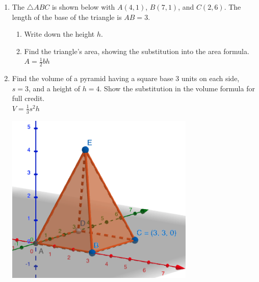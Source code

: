 \documentclass[12pt, twoside]{article}
\begin{document}
\begin{enumerate}
\newpage
\item The $\triangle ABC$ is shown below with $A(4,1)$, $B(7,1)$, and $C(2,6)$. The length of the base of the triangle is $AB=3$.
  \begin{multicols}{2}
    \begin{enumerate}
      \item Write down the height $h$.
      \item Find the triangle's area, showing the substitution into the area formula.\\[0.25cm]
      $A=\frac{1}{2}bh$ \vspace{2cm}
      \end{enumerate}
      \begin{flushright}
      \end{flushright}
  \end{multicols}

\newpage
\item Find the volume of a pyramid having a square base 3 units on each side, $s=3$, and a height of $h=4$. Show the substitution in the volume formula for full credit. \\[0.5cm]
$\displaystyle V = \frac{1}{3} s^2 h$
  \begin{flushright}
    \includegraphics[width=9cm]{6-15-4-pyramid.png}
  \end{flushright}


\end{enumerate}
\end{document}
